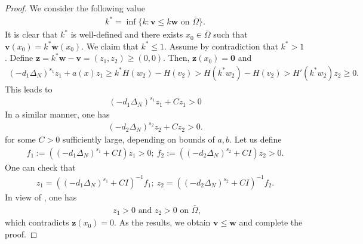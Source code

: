 \documentclass[a4paper,11pt]{amsart}
\theoremstyle{definition}
\def\O{\Omega}
\numberwithin{equation}{section}
\theoremstyle{definition}
\def\O{\Omega}
\begin{document}
\begin{proof}


We consider the following value
\begin{align*}
k^*=\inf\{k: \textbf{v}\leq k \textbf{w} \text{ on } \overline{\O}\}.
\end{align*}
It is clear that $k^*$ is well-defined and there exists $x_0\in \overline{\O}$ such that $\textbf{v}(x_0)=k^*\textbf{w}(x_0)$. We claim that $k^*\leq 1$. Assume by contradiction that $k^*>1$. 
Define $\textbf{z}=k^*\textbf{w}-\textbf{v}=(z_1,z_2)\geq (0,0)$. Then, $\textbf{z}(x_0)=\textbf{0}$ and
\begin{align*}
(-d_1\Delta_N)^{s_1}z_1+a(x)z_1\geq k^*H(w_2)-H(v_2)>H(k^*w_2)-H(v_2)>H'(k^*w_2)z_2\geq 0.
\end{align*}
This leads to
\begin{align*}
(-d_1\Delta_N)^{s_1}z_1+Cz_1>0
\end{align*}
In a similar manner, one has
\begin{align*}
(-d_2\Delta_N)^{s_2}z_2+Cz_2>0.
\end{align*}
for some $C>0$ sufficiently large, depending on bounds of $a,b$. Let us define
\begin{align*}
f_1:=((-d_1\Delta_N)^{s_1}+CI)z_1>0;~f_2:=((-d_2\Delta_N)^{s_2}+CI)z_2>0.
\end{align*}
One can check that 
\begin{align*}
z_1=((-d_1\Delta_N)^{s_1}+C I)^{-1}f_1;~z_2=((-d_2\Delta_N)^{s_2}+CI)^{-1}f_2.
\end{align*}
In view of \cite[Theorem 3.1, Step 3, Case 1]{zhao_spatiotemporal_2025}, one has
\begin{align*}
\text{  $z_1>0$ and $z_2>0$ on $\overline{\O}$, }
\end{align*}
which contradicts $\mathbf{z}(x_0)=0$. As the results, we obtain $\mathbf{v} \leq \mathbf{w}$ and complete the proof.
\end{proof}
\end{document}
